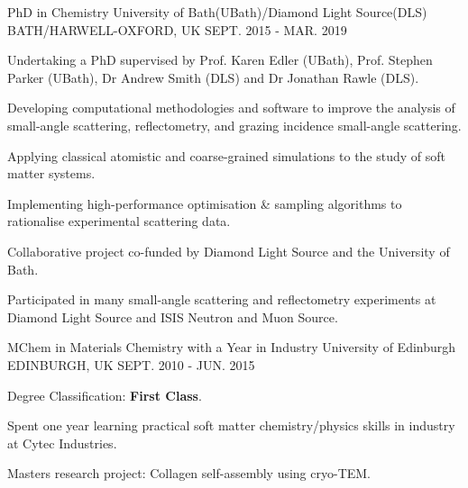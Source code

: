 \begin{cventries}
  \cventry
    {PhD in Chemistry}
    {University of Bath(UBath)/Diamond Light Source(DLS)}
    {BATH/HARWELL-OXFORD, UK}
    {SEPT. 2015 - MAR. 2019}
    {
      \begin{cvitems}
        \item {Undertaking a PhD supervised by Prof. Karen Edler (UBath), Prof. Stephen Parker (UBath), Dr Andrew Smith (DLS) and Dr Jonathan Rawle (DLS).}
        \item {Developing computational methodologies and software to improve the analysis of small-angle scattering, reflectometry, and grazing incidence small-angle scattering.}
        \item {Applying classical atomistic and coarse-grained simulations to the study of soft matter systems.}
        \item {Implementing high-performance optimisation \& sampling algorithms to rationalise experimental scattering data.}
        \item {Collaborative project co-funded by Diamond Light Source and the University of Bath.}
        \item {Participated in many small-angle scattering and reflectometry experiments at Diamond Light Source and ISIS Neutron and Muon Source.}
      \end{cvitems}
    }
  \cventry
    {MChem in Materials Chemistry with a Year in Industry}
    {University of Edinburgh}
    {EDINBURGH, UK}
    {SEPT. 2010 - JUN. 2015}
    {
      \begin{cvitems}
        \item {Degree Classification: \textbf{First Class}.}
        \item {Spent one year learning practical soft matter chemistry/physics skills in industry at Cytec Industries.}
        \item {Masters research project: Collagen self-assembly using cryo-TEM.}
      \end{cvitems}
    }
\end{cventries}
